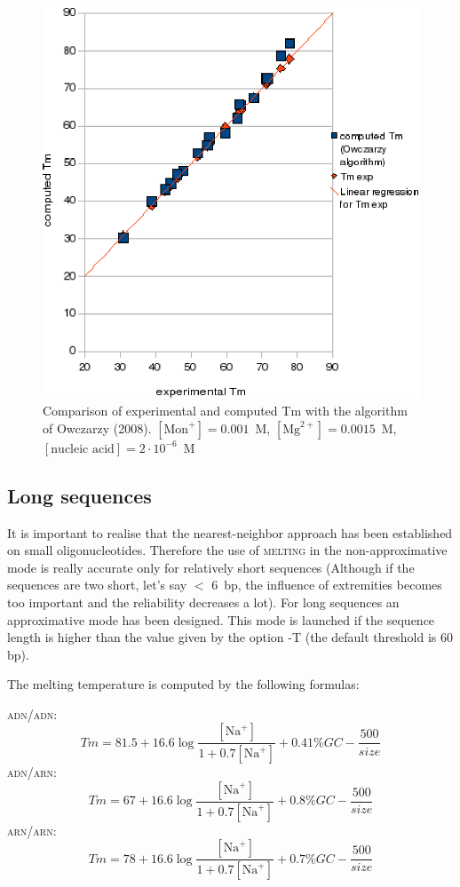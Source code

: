 \documentclass{article}
\begin{document}
\begin{figure}
\caption{Comparison of experimental and computed Tm with the algorithm of Owczarzy (2008). 
$[\mbox{Mon}^+] = 0.001$~M, $[\mbox{Mg}^{2+}] = 0.0015$~M, $[\mbox{nucleic acid}] =
2\cdot{}10^{-6}$~M}
\includegraphics{Owczarzy1.eps}
\end{figure}
    
\subsection{Long sequences }  
  It is important to realise that the nearest-neighbor approach 
has been established  on small oligonucleotides. Therefore the use of \textsc{melting} 
in the non-approximative  mode is really accurate only for relatively short 
sequences (Although if the sequences are two short, let's say $<$ 6~bp, the 
influence of extremities becomes too important and the  reliability decreases 
a lot). For long sequences an approximative mode has been designed. This mode is 
launched if the sequence length is higher than the value 
given by the option -T (the default threshold is 60 bp).
 
The melting temperature is computed by the following formulas:   

\textsc{adn/adn}:
\begin{displaymath}
Tm = 81.5 + 16.6\log\frac{[\mbox{Na}^+]}{1+0.7[\mbox{Na}^+]} + 0.41\% GC - \frac{500}{size}
\end{displaymath}
\textsc{adn/arn}:
\begin{displaymath}
Tm = 67 + 16.6\log\frac{[\mbox{Na}^+]}{1+0.7[\mbox{Na}^+]} + 0.8\% GC - \frac{500}{size}
\end{displaymath}
\textsc{arn/arn}:
\begin{displaymath}
Tm = 78 + 16.6\log\frac{[\mbox{Na}^+]}{1+0.7[\mbox{Na}^+]} + 0.7\% GC - \frac{500}{size}
\end{displaymath}
\end{document}
